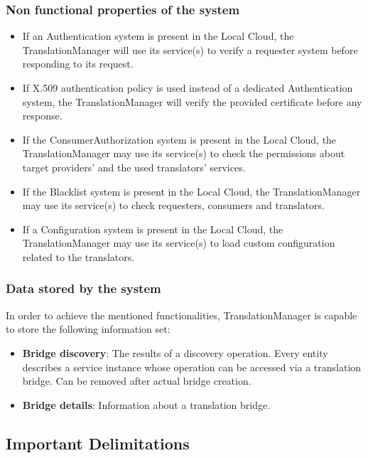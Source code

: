 \documentclass[a4paper]{arrowhead}
\begin{document}
\subsubsection {Non functional properties of the system}

\begin{itemize}
    \item If an Authentication system is present in the Local Cloud, the TranslationManager will use its service(s) to verify a requester system before responding to its request.
    \item If X.509 authentication policy is used instead of a dedicated Authentication system, the TranslationManager will verify the provided certificate before any response.
    \item If the ConsumerAuthorization system is present in the Local Cloud, the TranslationManager may use its service(s) to check the permissions about target providers' and the used translators' services.
    \item If the Blacklist system is present in the Local Cloud, the TranslationManager may use its service(s) to check requesters, consumers and translators.
    \item If a Configuration system is present in the Local Cloud, the TranslationManager may use its service(s) to load custom configuration related to the translators.
\end{itemize}
 

\subsubsection {Data stored by the system}
In order to achieve the mentioned functionalities, TranslationManager is capable to store the following information set:

\begin{itemize}
    \item \textbf{Bridge discovery}: The results of a discovery operation. Every entity describes a service instance whose operation can be accessed via a translation bridge. Can be removed after actual bridge creation.
    \item \textbf{Bridge details}: Information about a translation bridge.
\end{itemize}

\subsection{Important Delimitations}
\label{sec:delimitations}
\end{document}
